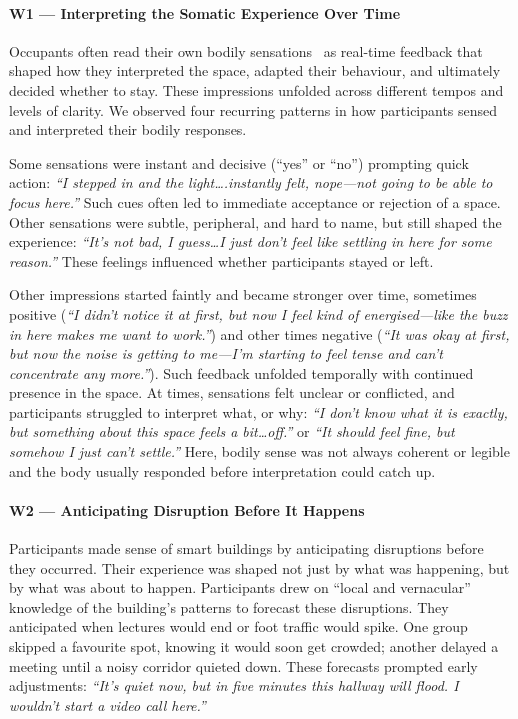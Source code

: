 \paragraph{W1 --- Interpreting the Somatic Experience Over Time}
\label{theme:w1}

Occupants often read their own bodily sensations~\cite{hook2018designing} as real-time feedback that shaped how they interpreted the space, adapted their behaviour, and ultimately decided whether to stay. These impressions unfolded across different tempos and levels of clarity. We observed four recurring patterns in how participants sensed and interpreted their bodily responses. 

Some sensations were instant and decisive (``yes'' or ``no'') prompting quick action: \textit{``I stepped in and the light\ldots.instantly felt, nope---not going to be able to focus here.''} Such cues often led to immediate acceptance or rejection of a space. Other sensations were subtle, peripheral, and hard to name, but still shaped the experience: \textit{``It’s not bad, I guess\ldots I just don’t feel like settling in here for some reason.''}  These feelings influenced whether participants stayed or left.

Other impressions started faintly and became stronger over time, sometimes positive (\textit{``I didn’t notice it at first, but now I feel kind of energised—like the buzz in here makes me want to work.''}) and other times negative (\textit{``It was okay at first, but now the noise is getting to me—I’m starting to feel tense and can't concentrate any more.''}). Such feedback unfolded temporally with continued presence in the space. At times, sensations felt unclear or conflicted, and participants struggled to interpret what, or why: \textit{``I don’t know what it is exactly, but something about this space feels a bit\ldots off.''}  or \textit{``It should feel fine, but somehow I just can’t settle.''} Here, bodily sense was not always coherent or legible and the body usually responded before interpretation could catch up.


\paragraph{W2 --- Anticipating Disruption Before It Happens}
\label{theme:w2}

Participants made sense of smart buildings by anticipating disruptions before they occurred. Their experience was shaped not just by what was happening, but by what was about to happen. Participants drew on ``local and vernacular'' knowledge of the building’s patterns to forecast these disruptions. They anticipated when lectures would end or foot traffic would spike. One group skipped a favourite spot, knowing it would soon get crowded; another delayed a meeting until a noisy corridor quieted down. These forecasts prompted early adjustments: \textit{“It’s quiet now, but in five minutes this hallway will flood. I wouldn’t start a video call here.”}

